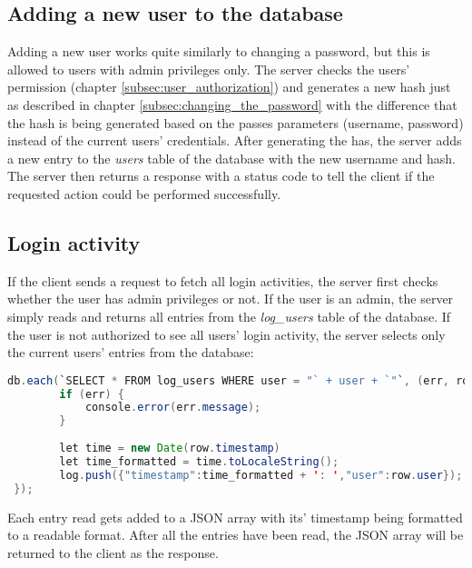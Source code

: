 \subsection{Adding a new user to the database}
\label{subsec:adding_a_new_user}

Adding a new user works quite similarly to changing a password, but this is allowed to users with admin privileges only. The server checks the users' permission (chapter \ref{subsec:user_authorization}) and generates a new hash just as described in chapter \ref{subsec:changing_the_password} with the difference that the hash is being generated based on the passes parameters (username, password) instead of the current users' credentials. After generating the has, the server adds a new entry to the \textit{users} table of the database with the new username and hash. The server then returns a response with a status code to tell the client if the requested action could be performed successfully.



\subsection{Login activity}
\label{subsec:login_activity}

If the client sends a request to fetch all login activities, the server first checks whether the user has admin privileges or not. If the user is an admin, the server simply reads and returns all entries from the \textit{log\_users} table of the database. If the user is not authorized to see all users' login activity, the server selects only the current users' entries from the database:

\begin{lstlisting}[language = Java, numbers = none]
 db.each(`SELECT * FROM log_users WHERE user = "` + user + `"`, (err, row) => {
 		if (err) {   
 			console.error(err.message);                                                              
 		}
                
 		let time = new Date(row.timestamp)
 		let time_formatted = time.toLocaleString();
 		log.push({"timestamp":time_formatted + ': ',"user":row.user});
 });
\end{lstlisting}

Each entry read gets added to a JSON array with its' timestamp being formatted to a readable format. After all the entries have been read, the JSON array will be returned to the client as the response.





